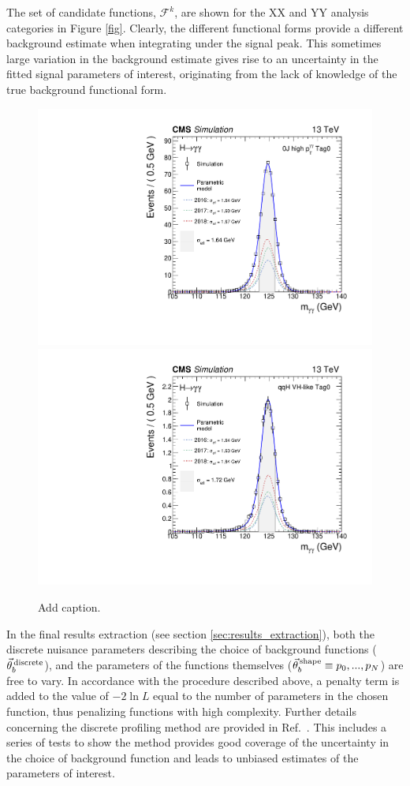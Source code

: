 The set of candidate functions, $\mathcal{F}^k$, are shown for the XX and YY analysis categories in Figure \ref{fig}. Clearly, the different functional forms provide a different background estimate when integrating under the signal peak. This sometimes large variation in the background estimate gives rise to an uncertainty in the fitted signal parameters of interest, originating from the lack of knowledge of the true background functional form.

\begin{figure}[hptb]
  \centering
  \includegraphics[width=.49\textwidth]{Figures/hgg_stats/smodel_RECO_0J_PTH_GT10_Tag0.pdf}
  \hfill
  \includegraphics[width=.49\textwidth]{Figures/hgg_stats/smodel_RECO_VBFTOPO_VHHAD_Tag0.pdf}
  \caption[Signal models for the 0J low \ptH Tag0 and qqH VH-like Tag0 categories]
  {
    Add caption.
  }
  \label{fig:sigmodels_category}
\end{figure}

In the final results extraction (see section \ref{sec:results_extraction}), both the discrete nuisance parameters describing the choice of background functions ($\vec{\theta}^{\,\rm{discrete}}_{b}$), and the parameters of the functions themselves ($\vec{\theta}^{\,\rm{shape}}_{b} \equiv p_0,...,p_N$) are free to vary. In accordance with the procedure described above, a penalty term is added to the value of $-2\ln{L}$ equal to the number of parameters in the chosen function, thus penalizing functions with high complexity. Further details concerning the discrete profiling method are provided in Ref.~\cite{Dauncey:2014xga}. This includes a series of tests to show the method provides good coverage of the uncertainty in the choice of background function and leads to unbiased estimates of the parameters of interest.

